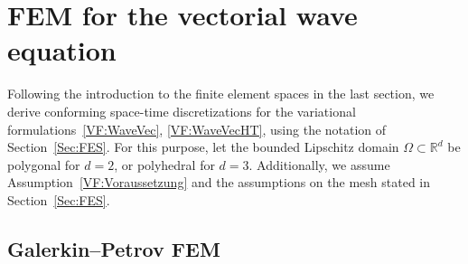 \documentclass[a4paper,11pt]{article}
\newcommand{\R}{\mathbb R}
\begin{document}
\section{FEM for the vectorial wave equation} \label{Sec:FEM}

Following the introduction to the finite element spaces in the last section, we derive conforming space-time discretizations for the variational formulations~\eqref{VF:WaveVec}, \eqref{VF:WaveVecHT}, using the notation of Section~\ref{Sec:FES}. For this purpose, let the bounded Lipschitz domain $\Omega \subset \R^d$ be polygonal for $d=2$, or polyhedral for $d=3$. Additionally, we assume Assumption~\ref{VF:Voraussetzung} and the assumptions on the mesh stated in Section~\ref{Sec:FES}.


\subsection{Galerkin--Petrov FEM} \label{Sec:FEM:WithoutHT}
\end{document}
